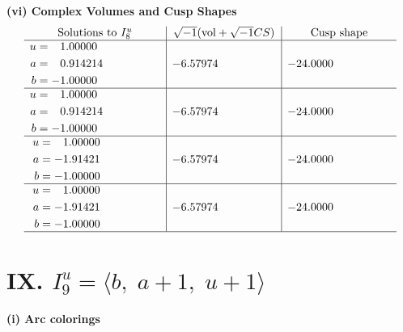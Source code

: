 \documentclass[1p]{elsarticle_modified}
\theoremstyle{definition}
\newcommand{\I}{\sqrt{-1}}
\begin{document}
\newpage\flushleft \textbf{(vi) Complex Volumes and Cusp Shapes}
$$\begin{array}{c|c|c}  
\text{Solutions to }I^u_{8}& \I (\text{vol} + \sqrt{-1}CS) & \text{Cusp shape}\\
 \hline 
\begin{aligned}
u &= \phantom{-}1.00000\phantom{ +0.000000I} \\
a &= \phantom{-}0.914214\phantom{ +0.000000I} \\
b &= -1.00000\phantom{ +0.000000I}\end{aligned}
 & -6.57974\phantom{ +0.000000I} & -24.0000\phantom{ +0.000000I} \\ \hline\begin{aligned}
u &= \phantom{-}1.00000\phantom{ +0.000000I} \\
a &= \phantom{-}0.914214\phantom{ +0.000000I} \\
b &= -1.00000\phantom{ +0.000000I}\end{aligned}
 & -6.57974\phantom{ +0.000000I} & -24.0000\phantom{ +0.000000I} \\ \hline\begin{aligned}
u &= \phantom{-}1.00000\phantom{ +0.000000I} \\
a &= -1.91421\phantom{ +0.000000I} \\
b &= -1.00000\phantom{ +0.000000I}\end{aligned}
 & -6.57974\phantom{ +0.000000I} & -24.0000\phantom{ +0.000000I} \\ \hline\begin{aligned}
u &= \phantom{-}1.00000\phantom{ +0.000000I} \\
a &= -1.91421\phantom{ +0.000000I} \\
b &= -1.00000\phantom{ +0.000000I}\end{aligned}
 & -6.57974\phantom{ +0.000000I} & -24.0000\phantom{ +0.000000I}\\
 \hline 
 \end{array}$$\newpage\newpage\renewcommand{\arraystretch}{1}
\centering \section*{IX. $I^u_{9}= \langle b,\;a+1,\;u+1 \rangle$}
\flushleft \textbf{(i) Arc colorings}\\
\end{document}
